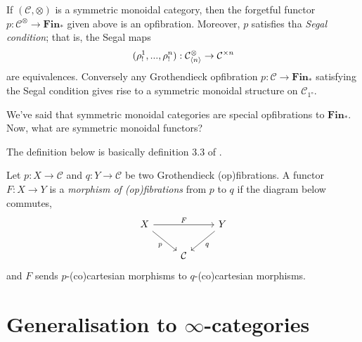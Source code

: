 \documentclass{MetricNotes2023}
\begin{document}
\begin{proposition}
If \((\mathcal{C}, \otimes)\) is a symmetric monoidal category, then the forgetful functor \(p : \mathcal{C}^\otimes \to \textbf{Fin}_*\) given above is an opfibration. Moreover, \(p\) satisfies tha \textit{Segal condition}; that is, the Segal maps 
\[(\rho_!^1, ..., \rho_!^n) : \mathcal{C}^\otimes_{\langle n\rangle}\to \mathcal{C}^{\times n}\]
are equivalences. Conversely any Grothendieck opfibration \(p : \mathcal{C} \to \textbf{Fin}_*\) satisfying the Segal condition gives rise to a symmetric monoidal structure on \(\mathcal{C}_{\ang{1}}\).
\end{proposition}

We've said that symmetric monoidal categories are special opfibrations to \(\textbf{Fin}_*\). Now, what are symmetric monoidal functors? 

The definition below is basically definition 3.3 of \autocite{symmetricmonoidal}.

\begin{definition}
Let \(p : X \to \mathcal{C}\) and \(q : Y \to \mathcal{C}\) be two Grothendieck (op)fibrations. A functor \(F : X \to Y\) is a \textit{morphism of (op)fibrations} from \(p\) to \(q\) if the diagram below commutes,
\[\begin{tikzcd}
X \arrow[rd, swap, "p"] \arrow[rr, "F"]  & & Y \arrow[ld, "q"]  \\
& \mathcal{C}  & 
\end{tikzcd}\]
and \(F\) sends \(p\)-(co)cartesian morphisms to \(q\)-(co)cartesian morphisms. 
\end{definition}

\section{Generalisation to \(\infty\)-categories}
\end{document}
